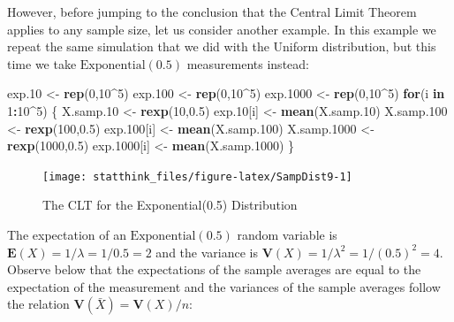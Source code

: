 \documentclass[]{krantz}
\makeatletter
\newenvironment{Shaded}{\begin{snugshade}}{\end{snugshade}}
\newcommand{\ControlFlowTok}[1]{\textcolor[rgb]{0.13,0.29,0.53}{\textbf{#1}}}
\newcommand{\DecValTok}[1]{\textcolor[rgb]{0.00,0.00,0.81}{#1}}
\newcommand{\FloatTok}[1]{\textcolor[rgb]{0.00,0.00,0.81}{#1}}
\newcommand{\KeywordTok}[1]{\textcolor[rgb]{0.13,0.29,0.53}{\textbf{#1}}}
\newcommand{\NormalTok}[1]{#1}
\newcommand{\OperatorTok}[1]{\textcolor[rgb]{0.81,0.36,0.00}{\textbf{#1}}}
\newcommand{\StringTok}[1]{\textcolor[rgb]{0.31,0.60,0.02}{#1}}
\newcommand{\Expec}{\mathbf{E}}
\newcommand{\Var}{\mathbf{V}}
\newenvironment{kframe}{%
\medskip{}
\setlength{\fboxsep}{.8em}
 \def\at@end@of@kframe{}%
 \ifinner\ifhmode%
  \def\at@end@of@kframe{\end{minipage}}%
  \begin{minipage}{\columnwidth}%
 \fi\fi%
 \def\FrameCommand##1{\hskip\@totalleftmargin \hskip-\fboxsep
 \colorbox{shadecolor}{##1}\hskip-\fboxsep
     \hskip-\linewidth \hskip-\@totalleftmargin \hskip\columnwidth}%
 \MakeFramed {\advance\hsize-\width
   \@totalleftmargin\z@ \linewidth\hsize
   \@setminipage}}%
 {\par\unskip\endMakeFramed%
 \at@end@of@kframe}
\renewenvironment{Shaded}{\begin{kframe}}{\end{kframe}}
\theoremstyle{definition}
\theoremstyle{definition}
\theoremstyle{definition}
\theoremstyle{remark}
\makeatother
\begin{document}
However, before jumping to the conclusion that the Central Limit Theorem
applies to any sample size, let us consider another example. In this
example we repeat the same simulation that we did with the Uniform
distribution, but this time we take \(\mathrm{Exponential}(0.5)\)
measurements instead:

\begin{Shaded}
\begin{Highlighting}[]
\NormalTok{exp}\FloatTok{.10}\NormalTok{ <-}\StringTok{ }\KeywordTok{rep}\NormalTok{(}\DecValTok{0}\NormalTok{,}\DecValTok{10}\OperatorTok{^}\DecValTok{5}\NormalTok{)}
\NormalTok{exp}\FloatTok{.100}\NormalTok{ <-}\StringTok{ }\KeywordTok{rep}\NormalTok{(}\DecValTok{0}\NormalTok{,}\DecValTok{10}\OperatorTok{^}\DecValTok{5}\NormalTok{)}
\NormalTok{exp}\FloatTok{.1000}\NormalTok{ <-}\StringTok{ }\KeywordTok{rep}\NormalTok{(}\DecValTok{0}\NormalTok{,}\DecValTok{10}\OperatorTok{^}\DecValTok{5}\NormalTok{)}
\ControlFlowTok{for}\NormalTok{(i }\ControlFlowTok{in} \DecValTok{1}\OperatorTok{:}\DecValTok{10}\OperatorTok{^}\DecValTok{5}\NormalTok{) \{}
\NormalTok{  X.samp}\FloatTok{.10}\NormalTok{ <-}\StringTok{ }\KeywordTok{rexp}\NormalTok{(}\DecValTok{10}\NormalTok{,}\FloatTok{0.5}\NormalTok{)}
\NormalTok{  exp}\FloatTok{.10}\NormalTok{[i] <-}\StringTok{ }\KeywordTok{mean}\NormalTok{(X.samp}\FloatTok{.10}\NormalTok{)}
\NormalTok{  X.samp}\FloatTok{.100}\NormalTok{ <-}\StringTok{ }\KeywordTok{rexp}\NormalTok{(}\DecValTok{100}\NormalTok{,}\FloatTok{0.5}\NormalTok{)}
\NormalTok{  exp}\FloatTok{.100}\NormalTok{[i] <-}\StringTok{ }\KeywordTok{mean}\NormalTok{(X.samp}\FloatTok{.100}\NormalTok{)}
\NormalTok{  X.samp}\FloatTok{.1000}\NormalTok{ <-}\StringTok{ }\KeywordTok{rexp}\NormalTok{(}\DecValTok{1000}\NormalTok{,}\FloatTok{0.5}\NormalTok{)}
\NormalTok{  exp}\FloatTok{.1000}\NormalTok{[i] <-}\StringTok{ }\KeywordTok{mean}\NormalTok{(X.samp}\FloatTok{.1000}\NormalTok{)}
\NormalTok{\}}
\end{Highlighting}
\end{Shaded}

\begin{figure}

{\centering \texttt{[image: statthink\_files/figure-latex/SampDist9-1]} 

}

\caption{The CLT for the Exponential(0.5) Distribution}\label{fig:SampDist9}
\end{figure}

The expectation of an \(\mathrm{Exponential}(0.5)\) random variable is
\(\Expec(X) = 1/\lambda = 1/0.5 = 2\) and the variance is
\(\Var(X) = 1/\lambda^2 = 1/(0.5)^2 = 4\). Observe below that the
expectations of the sample averages are equal to the expectation of the
measurement and the variances of the sample averages follow the relation
\(\Var(\bar X) = \Var (X)/n\):
\end{document}

